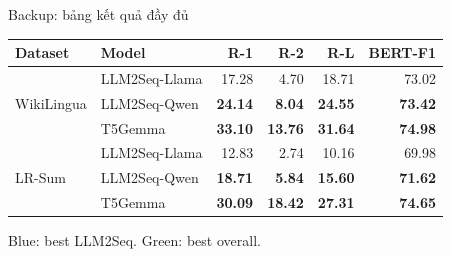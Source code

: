 \documentclass[aspectratio=169,11pt]{beamer}
\begin{document}
\begin{frame}{Backup: bảng kết quả đầy đủ}
  \centering\footnotesize
  \setlength{\tabcolsep}{5pt}\renewcommand{\arraystretch}{1.12}
  \begin{tabular}{llrrrr}
    \toprule Dataset & Model & R-1 & R-2 & R-L & BERT-F1 \\ \midrule
    \multirow{3}{*}{WikiLingua} & LLM2Seq-Llama & 17.28 & 4.70 & 18.71 & 73.02 \\
    & \cellcolor{LLMBlue!35}LLM2Seq-Qwen & \cellcolor{LLMBlue!35}\textbf{24.14} & \cellcolor{LLMBlue!35}\textbf{8.04} & \cellcolor{LLMBlue!35}\textbf{24.55} & \cellcolor{LLMBlue!35}\textbf{73.42} \\
    & \cellcolor{LLMGreen!35}T5Gemma & \cellcolor{LLMGreen!35}\textbf{33.10} & \cellcolor{LLMGreen!35}\textbf{13.76} & \cellcolor{LLMGreen!35}\textbf{31.64} & \cellcolor{LLMGreen!35}\textbf{74.98} \\ \midrule
    \multirow{3}{*}{LR-Sum} & LLM2Seq-Llama & 12.83 & 2.74 & 10.16 & 69.98 \\
    & \cellcolor{LLMBlue!35}LLM2Seq-Qwen & \cellcolor{LLMBlue!35}\textbf{18.71} & \cellcolor{LLMBlue!35}\textbf{5.84} & \cellcolor{LLMBlue!35}\textbf{15.60} & \cellcolor{LLMBlue!35}\textbf{71.62} \\
    & \cellcolor{LLMGreen!35}T5Gemma & \cellcolor{LLMGreen!35}\textbf{30.09} & \cellcolor{LLMGreen!35}\textbf{18.42} & \cellcolor{LLMGreen!35}\textbf{27.31} & \cellcolor{LLMGreen!35}\textbf{74.65} \\ \bottomrule
  \end{tabular}
  \vfill\small Blue: best LLM2Seq. \quad Green: best overall.
\end{frame}
\end{document}
